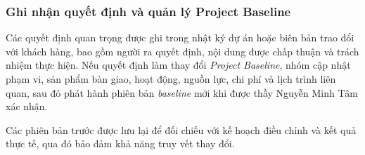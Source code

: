 \subsubsection{Ghi nhận quyết định và quản lý Project Baseline}

Các quyết định quan trọng được ghi trong nhật ký dự án hoặc biên bản trao đổi với khách hàng, bao gồm người ra quyết định, nội dung được chấp thuận và trách nhiệm thực hiện. Nếu quyết định làm thay đổi \textit{Project Baseline}, nhóm cập nhật phạm vi, sản phẩm bàn giao, hoạt động, nguồn lực, chi phí và lịch trình liên quan, sau đó phát hành phiên bản \textit{baseline} mới khi được thầy Nguyễn Minh Tâm xác nhận.

Các phiên bản trước được lưu lại để đối chiếu với kế hoạch điều chỉnh và kết quả thực tế, qua đó bảo đảm khả năng truy vết thay đổi.